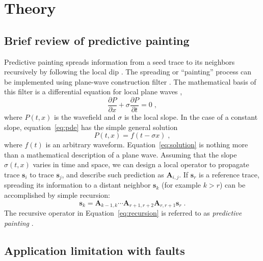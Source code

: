 \section{Theory}
\subsection{Brief review of predictive painting}

Predictive painting spreads information from a seed trace to its neighbors recursively by following the local dip \cite[]{fomel10b}. 
The spreading or ``painting'' process can be implemented using plane-wave construction filter \cite[]{fomel06}.
The mathematical basis of this filter is a differential equation for local plane waves \cite[]{claerbout92},
\begin{equation}
\label{eq:pde}
\frac{\partial P}{\partial x} + \sigma \frac{\partial P}{\partial t} =0 \;,
\end{equation}
where $P(t,x)$ is the wavefield and $\sigma$ is the local slope.
In the case of a constant slope, equation~\ref{eq:pde} has the simple general solution
\begin{equation}
\label{eq:solution}
P(t,x)=f(t-\sigma x) \; ,
\end{equation}
where $f(t)$ is an arbitrary waveform.
Equation~\ref{eq:solution} is nothing more than a mathematical description of a plane wave.
Assuming that the slope $\sigma(t,x)$ varies in time and space, we can design a local operator to propagate trace $\mathbf{s}_i$ to trace $\mathbf{s}_j$, and describe such prediction as $\mathbf{A}_{i,j}$.
If $\mathbf{s}_r$ is a reference trace, spreading its information to a distant neighbor $\mathbf{s}_k$ (for example $k>r$) can be accomplished by simple recursion: 
\begin{equation}
\label{eq:recursion}
\mathbf{s}_k = \mathbf{A}_{k-1,k} \cdots \mathbf{A}_{r+1,r+2} \mathbf{A}_{r,r+1} \mathbf{s}_r \; .
\end{equation}
The recursive operator in Equation~\ref{eq:recursion} is referred to as \emph{predictive painting} \cite[]{fomel10b}.

\subsection{Application limitation with faults}


